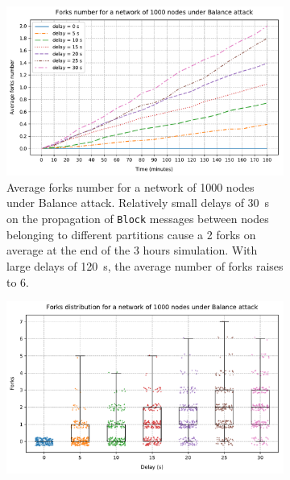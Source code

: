 \begin{figure}[h]
	\begin{subfigure}{\textwidth}
		\centering
		\includegraphics[width=\myplotswitdth \columnwidth]{plots/forks_attack_delay_1000_linechart}
		\vspace*{0.25cm}
		\caption{
			Average forks number for a network of \num{1000} nodes under Balance attack.
			Relatively small delays of \SI{30}{\second} on the propagation of \texttt{Block} messages between nodes belonging to different partitions cause a \num{2} forks on average at the end of the \num{3} hours simulation.
			With large delays of \SI{120}{\second}, the average number of forks raises to \num{6}.
		}
		\vspace*{0.75cm}
	\end{subfigure}
	\begin{subfigure}{\textwidth}
		\centering
		\vspace*{0.25cm}
		\includegraphics[width=\myplotswitdth \columnwidth]{plots/forks_attack_delay_1000_boxplot}

\end{subfigure}
\end{figure}
